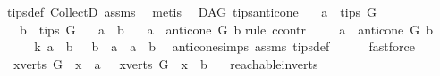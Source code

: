 \begin{isabellebody}
\ tips{\isacharunderscore}{\kern0pt}def\ CollectD\ assms{\isacharparenleft}{\kern0pt}{}{\isacharparenright}{\kern0pt}\ \isamarkupfalse%
\ metis%
\endisatagproof
{\isafoldproof}%
%
\isadelimproof
%
\endisadelimproof
%
\isadelimdocument
%
\endisadelimdocument
%
\isatagdocument
%
\isamarkuptrue%
%
\endisatagdocument
{\isafolddocument}%
%
\isadelimdocument
%
\endisadelimdocument
{}\isamarkupfalse%
\ {\isacharparenleft}{\kern0pt}\ DAG{\isacharparenright}{\kern0pt}\ tips{\isacharunderscore}{\kern0pt}anticone{\isacharcolon}{\kern0pt}\isanewline
\ \ \ {\isachardoublequoteopen}a\ {\isasymin}\ tips\ G{\isachardoublequoteclose}\isanewline
\ \ \ {\isachardoublequoteopen}b\ {\isasymin}\ tips\ G{\isachardoublequoteclose}\isanewline
\ \ \ {\isachardoublequoteopen}a\ {\isasymnoteq}\ b{\isachardoublequoteclose}\isanewline
\ \ \ {\isachardoublequoteopen}a\ {\isasymin}\ anticone\ G\ b{\isachardoublequoteclose}\isanewline
%
\isadelimproof
%
\endisadelimproof
%
\isatagproof
{}\isamarkupfalse%
{\isacharparenleft}{\kern0pt}rule\ ccontr{\isacharparenright}{\kern0pt}\isanewline
\ \ \isamarkupfalse%
\ {\isachardoublequoteopen}\ a\ {\isasymnotin}\ anticone\ G\ b{\isachardoublequoteclose}\ \isanewline
\ \ \isamarkupfalse%
\ \isamarkupfalse%
\ k{\isacharcolon}{\kern0pt}\ {\isachardoublequoteopen}{\isacharparenleft}{\kern0pt}a\ {\isasymrightarrow}\isactrlsup {\isacharplus}{\kern0pt}\ b\ {\isasymor}\ \ b\ {\isasymrightarrow}\isactrlsup {\isacharplus}{\kern0pt}\ a\ {\isasymor}\ a\ {\isacharequal}{\kern0pt}\ b{\isacharparenright}{\kern0pt}{\isachardoublequoteclose}\ \isamarkupfalse%
\ anticone{\isachardot}{\kern0pt}simps\ assms\ tips{\isacharunderscore}{\kern0pt}def\isanewline
\ \ \ \ \isamarkupfalse%
\ fastforce\ \isanewline
\ \ \isamarkupfalse%
\ \isamarkupfalse%
\ {\isachardoublequoteopen}{\isasymnot}\ {\isacharparenleft}{\kern0pt}{\isasymforall}x{\isasymin}verts\ G{\isachardot}{\kern0pt}\ \ x\ {\isasymrightarrow}\isactrlsup {\isacharplus}{\kern0pt}\ a{\isacharparenright}{\kern0pt}\ {\isasymor}\ {\isasymnot}\ {\isacharparenleft}{\kern0pt}{\isasymforall}x{\isasymin}verts\ G{\isachardot}{\kern0pt}\ \ x\ {\isasymrightarrow}\isactrlsup {\isacharplus}{\kern0pt}\ b{\isacharparenright}{\kern0pt}{\isachardoublequoteclose}\ \isamarkupfalse%
\ \ reachable{}{\isacharunderscore}{\kern0pt}in{\isacharunderscore}{\kern0pt}verts\isanewline

\end{isabellebody}
